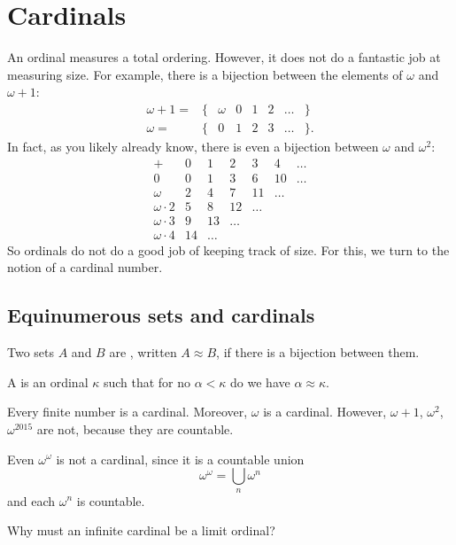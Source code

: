 \chapter{Cardinals}
An ordinal measures a total ordering.
However, it does not do a fantastic job at measuring size.
For example, there is a bijection between the elements of $\omega$ and $\omega+1$:
\[
	\begin{array}{rccccccc}
		\omega+1 = & \{ & \omega & 0 & 1 & 2 & \dots & \} \\
		\omega = & \{ & 0 & 1 & 2 & 3 & \dots & \}.
	\end{array}
\]
In fact, as you likely already know,
there is even a bijection between $\omega$ and $\omega^2$:
\[
	\begin{array}{l|cccccc}
		+ & 0 & 1 & 2 & 3 & 4 & \dots \\ \hline
		0 & 0 & 1 & 3 & 6 & 10 & \dots \\
		\omega & 2 & 4 & 7 & 11 & \dots & \\
		\omega \cdot 2 & 5 & 8 & 12 & \dots & & \\
		\omega \cdot 3 & 9 & 13 & \dots & & & \\
		\omega \cdot 4 & 14 & \dots & & & &
	\end{array}
\]
So ordinals do not do a good job of keeping track of size.
For this, we turn to the notion of a cardinal number.

\section{Equinumerous sets and cardinals}
\begin{definition}
	Two sets $A$ and $B$ are , written $A \approx B$,
	if there is a bijection between them.
\end{definition}

\begin{definition}
	A  is an ordinal $\kappa$ such that
	for no $\alpha < \kappa$ do we have $\alpha \approx \kappa$.
\end{definition}
\begin{example}
	Every finite number is a cardinal.
	Moreover, $\omega$ is a cardinal.
	However, $\omega+1$, $\omega^2$, $\omega^{2015}$ are not,
	because they are countable.
\end{example}
\begin{example}
	Even $\omega^\omega$ is not a cardinal,
	since it is a countable union
	\[ \omega^\omega = \bigcup_n \omega^n \]
	and each $\omega^n$ is countable.
\end{example}
\begin{ques}
	Why must an infinite cardinal be a limit ordinal?
\end{ques}

